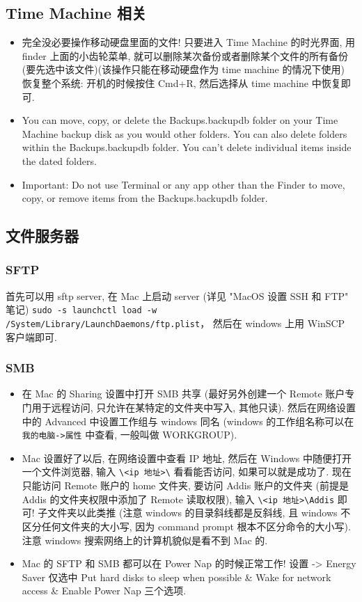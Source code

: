 \subsection{Time Machine 相关}
\begin{itemize}
\item 完全没必要操作移动硬盘里面的文件! 只要进入 Time Machine 的时光界面, 用 finder 上面的小齿轮菜单, 就可以删除某次备份或者删除某个文件的所有备份 (要先选中该文件)(该操作只能在移动硬盘作为 time machine 的情况下使用)
恢复整个系统: 开机的时候按住 Cmd+R, 然后选择从 time machine 中恢复即可.
\item You can move, copy, or delete the Backups.backupdb folder on your Time Machine backup disk as you would other folders. You can also delete folders within the Backups.backupdb folder. You can’t delete individual items inside the dated folders.
\item Important: Do not use Terminal or any app other than the Finder to move, copy, or remove items from the Backups.backupdb folder.
\end{itemize}

\subsection{文件服务器}
\subsubsection{SFTP}
首先可以用 sftp server, 在 Mac 上启动 server (详见 "MacOS 设置 SSH 和 FTP" 笔记)
\verb|sudo -s launchctl load -w /System/Library/LaunchDaemons/ftp.plist|， 然后在 windows 上用 WinSCP 客户端即可.

\subsubsection{SMB}
\begin{itemize}
\item 在 Mac 的 Sharing 设置中打开 SMB 共享 (最好另外创建一个 Remote 账户专门用于远程访问, 只允许在某特定的文件夹中写入, 其他只读). 然后在网络设置中的 Advanced 中设置工作组与 windows 同名 (windows 的工作组名称可以在 \verb|我的电脑->属性| 中查看, 一般叫做 WORKGROUP).

\item Mac 设置好了以后, 在网络设置中查看 IP 地址, 然后在 Windows 中随便打开一个文件浏览器, 输入 \verb|\<ip 地址>\| 看看能否访问, 如果可以就是成功了. 现在只能访问 Remote 账户的 home 文件夹, 要访问 Addis 账户的文件夹 (前提是 Addis 的文件夹权限中添加了 Remote 读取权限), 输入 \verb|\<ip 地址>\Addis| 即可! 子文件夹以此类推 (注意 windows 的目录斜线都是反斜线, 且 windows 不区分任何文件夹的大小写, 因为 command prompt 根本不区分命令的大小写). 注意 windows 搜索网络上的计算机貌似是看不到 Mac 的.

\item Mac 的 SFTP 和 SMB 都可以在 Power Nap 的时候正常工作! 设置 -> Energy Saver 仅选中 Put hard disks to sleep when possible \& Wake for network access \& Enable Power Nap 三个选项.
\end{itemize}

